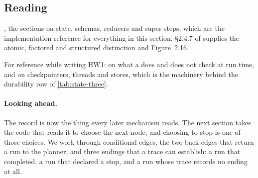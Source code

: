 \subsection{Reading}

\citet{langgraph-graph-api}, the sections on state, schemas, reducers and
super-steps, which are the implementation reference for everything in this section. \S2.4.7 of
\citet{russell2020aima} supplies the atomic, factored and structured distinction and
Figure~2.16.

For reference while writing HW1: \citet{pep589} on what a  does and does not
check at run time, and \citet{langgraph-persistence} on checkpointers, threads and stores, which is
the machinery behind the durability row of \cref{tab:state-three}.

\paragraph{Looking ahead.} The record is now the thing every later mechanism reads. The next
section takes the code that reads it to choose the next node, and choosing to stop is one of those
choices. We work through conditional edges, the two back edges that return a run to the planner,
and three endings that a trace can establish: a run that completed, a run that declared a stop, and
a run whose trace records no ending at all.
